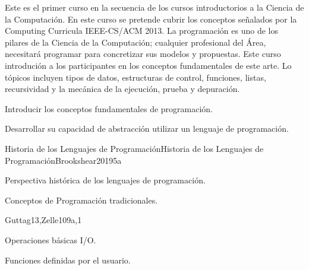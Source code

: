 \begin{syllabus}

\begin{justification}
Este es el primer curso en la secuencia de los cursos introductorios a la Ciencia de la Computación. 
En este curso se pretende cubrir los conceptos señalados por la Computing Curricula IEEE-CS/ACM 2013.
La programación es uno de los pilares de la Ciencia de la Computación; cualquier profesional del Área, necesitará programar para concretizar sus modelos y propuestas.
Este curso introdución a los participantes en los conceptos fundamentales de este arte. 
Lo tópicos incluyen tipos de datos, estructuras de control, funciones, listas, recursividad y la mecánica de la ejecución, prueba y depuración.
\end{justification}
 
\begin{goals}
\item Introducir los conceptos fundamentales de programación.
\item Desarrollar su capacidad de abstracción utilizar un lenguaje de programación.
\end{goals}



\begin{unit}{Historia de los Lenguajes de Programación}{Historia de los Lenguajes de Programación}{Brookshear2019}{5}{a}
    \begin{topics}
        \item Perspectiva histórica de los lenguajes de programación.
        \item Conceptos de Programación tradicionales.
    \end{topics}
    
    \begin{learningoutcomes}
        \item \SPHistoryLOIdentifySignificant [\Familiarity]
        \item \SPHistoryLODiscussTheForLanguage [\Familiarity]
    \end{learningoutcomes}
\end{unit}


\begin{unit}{\SDFFundamentalProgrammingConcepts}{}{Guttag13,Zelle10}{9}{a,1}
    \begin{topics}
        \item \SDFFundamentalProgrammingConceptsTopicBasic
        \item \SDFFundamentalProgrammingConceptsTopicVariables
        \item \SDFFundamentalProgrammingConceptsTopicExpressions
	\item Operaciones básicas I/O.
        \item \SDFFundamentalProgrammingConceptsTopicConditional
	\item  Funciones definidas por el usuario.
        \item \SDFFundamentalProgrammingConceptsTopicFunctions
        \item \SDFFundamentalProgrammingConceptsTopicThe
    \end{topics}


\end{unit}
\end{syllabus}
